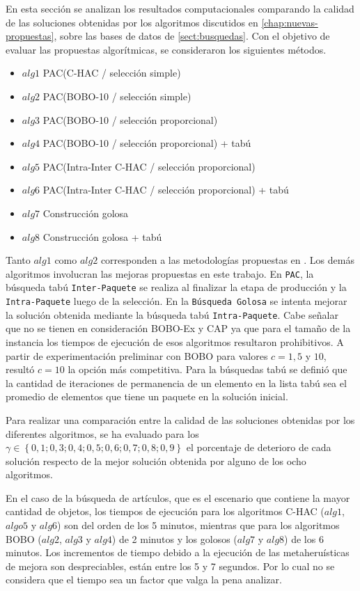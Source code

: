 En esta sección se analizan los resultados computacionales comparando la calidad de las soluciones obtenidas por los algoritmos discutidos en \autoref{chap:nuevas-propuestas}, sobre las bases de datos de \autoref{sect:busquedas}. Con el objetivo de evaluar las propuestas algorítmicas, se consideraron los siguientes métodos.

\begin{itemize}
\item{$alg1$} PAC(C-HAC / selección simple)
\item{$alg2$} PAC(BOBO-10 / selección simple)
\item{$alg3$} PAC(BOBO-10 / selección proporcional)
\item{$alg4$} PAC(BOBO-10 / selección proporcional) + tabú
\item{$alg5$} PAC(Intra-Inter C-HAC / selección proporcional)
\item{$alg6$} PAC(Intra-Inter C-HAC / selección proporcional) + tabú
\item{$alg7$} Construcción golosa
\item{$alg8$} Construcción golosa + tabú
\end{itemize}

Tanto $alg1$ como $alg2$ corresponden a las metodologías propuestas en \cite{journals/tkde/Amer-YahiaBCFMZ14}. Los demás algoritmos involucran las mejoras propuestas en este trabajo. En \texttt{PAC}, la búsqueda tabú \texttt{Inter-Paquete} se realiza al finalizar la etapa de producción y la \texttt{Intra-Paquete} luego de la selección. En la \texttt{Búsqueda Golosa} se intenta mejorar la solución obtenida mediante la búsqueda tabú \texttt{Intra-Paquete}. Cabe señalar que no se tienen en consideración BOBO-Ex y CAP ya que para el tamaño de la instancia los tiempos de ejecución de esos algoritmos resultaron prohibitivos. A partir de experimentación preliminar con BOBO para valores $c=1, 5$ y $10$, resultó $c=10$ la opción más competitiva. Para la búsquedas tabú se definió que la cantidad de iteraciones de permanencia de un elemento en la lista tabú sea el promedio de elementos que tiene un paquete en la solución inicial.

Para realizar una comparación entre la calidad de las soluciones obtenidas por los diferentes algoritmos, se ha evaluado para los $\gamma \in \left\{0,1; 0,3; 0,4; 0,5; 0,6; 0,7; 0,8; 0,9\right\}$ el porcentaje de deterioro de cada solución respecto de la mejor solución obtenida por alguno de los ocho algoritmos.

En el caso de la búsqueda de artículos, que es el escenario que contiene la mayor cantidad de objetos, los tiempos de ejecución  para los algoritmos C-HAC ($alg1$, $algo5$ y $alg6$) son del orden de los 5 minutos, mientras que para los algoritmos BOBO ($alg2$, $alg3$ y $alg4$) de 2 minutos y los golosos ($alg7$ y $alg8$) de los 6 minutos. Los incrementos de tiempo debido a la ejecución de las metaheruísticas de mejora son despreciables, están entre los 5 y 7 segundos. Por lo cual no se considera que el tiempo sea un factor que valga la pena analizar.

